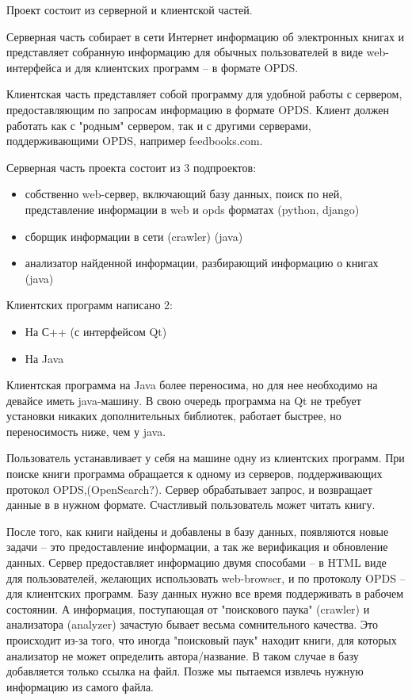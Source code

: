 \documentclass[a4paper]{report}
\begin{document}
Проект состоит из серверной и клиентской частей.

Серверная часть собирает в сети Интернет информацию об электронных книгах и представляет собранную информацию для обычных пользователей в виде web-интерфейса и для клиентских программ -- в формате OPDS.

Клиентская часть представляет собой программу для удобной работы с сервером, предоставляющим по запросам информацию в формате OPDS. Клиент должен работать как с "родным" сервером, так и с другими серверами, поддерживающими OPDS, например feedbooks.com.

Серверная часть проекта состоит из 3 подпроектов:
\begin{itemize}
	\item собственно web-сервер, включающий базу данных, поиск по ней, представление информации в web и opds форматах (python, django)
	\item сборщик информации в сети (crawler) (java)
	\item анализатор найденной информации, разбирающий информацию о книгах (java) 
\end{itemize}
Клиентских программ написано 2:
\begin{itemize}
	\item На С++ (с интерфейсом Qt)
	\item На Java 
\end{itemize}

Клиентская программа на Java более переносима, но для нее необходимо на девайсе иметь java-машину. В свою очередь программа на Qt не требует установки никаких дополнительных библиотек, работает быстрее, но переносимость ниже, чем у java.
		


Пользователь устанавливает у себя на машине одну из клиентских программ. При поиске книги программа обращается к одному из серверов, поддерживающих протокол OPDS,(OpenSearch?). Сервер обрабатывает запрос, и возвращает данные в в нужном формате. Счастливый пользователь может читать книгу.



После того, как книги найдены и добавлены в базу данных, появляются новые задачи -- это предоставление информации, а так же верификация и обновление данных. Сервер предоставляет информацию двумя способами -- в HTML виде для пользователей, желающих использовать web-browser, и по протоколу OPDS -- для клиентских программ. Базу данных нужно все время поддерживать в рабочем состоянии. А информация, поступающая от "поискового паука" (crawler) и анализатора (analyzer) зачастую бывает весьма сомнительного качества. Это происходит из-за того, что иногда "поисковый паук" находит книги, для которых анализатор не может определить автора/название. В таком случае в базу добавляется только ссылка на файл. 
Позже мы пытаемся извлечь нужную информацию из самого файла.
\end{document}
